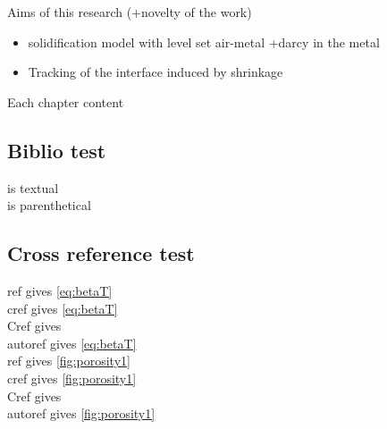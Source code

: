 Aims of this research (+novelty of the work)\\ 
\begin{itemize}
\item solidification model with level set air-metal +darcy in the metal
\item Tracking of the interface induced by shrinkage
\end{itemize}
Each chapter content
\subsection*{Biblio test}
\citet{carozzani_direct_2013} is textual \\
\citep{carozzani_direct_2013} is parenthetical \\
\subsection*{Cross reference test}
ref gives \ref{eq:betaT} \\
cref gives \cref{eq:betaT} \\
Cref gives  \\
autoref gives \autoref{eq:betaT} \\


ref gives \ref{fig:porosity1} \\
cref gives \cref{fig:porosity1} \\
Cref gives  \\
autoref gives \autoref{fig:porosity1} \\



